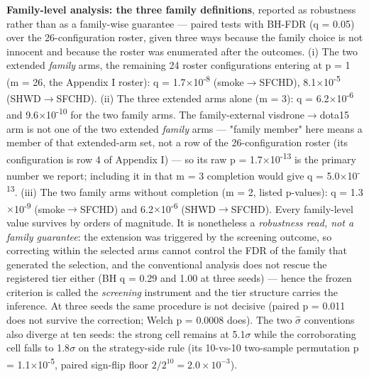 \documentclass[pdflatex,sn-mathphys-ay]{sn-jnl}
\begin{document}
\textbf{Family-level analysis: the three family definitions}, reported as robustness rather than as a family-wise guarantee --- paired tests with BH-FDR (q = 0.05) over the 26-configuration roster, given three ways because the family choice is not innocent and because the roster was enumerated after the outcomes. (i) The two extended \emph{family} arms, the remaining 24 roster configurations entering at p = 1 (m = 26, the Appendix I roster): q = 1.7\ensuremath{\times}10\textsuperscript{-8} (smoke\ensuremath{\rightarrow}SFCHD), 8.1\ensuremath{\times}10\textsuperscript{-5} (SHWD\ensuremath{\rightarrow}SFCHD). (ii) The three extended arms alone (m = 3): q = 6.2\ensuremath{\times}10\textsuperscript{-6} and 9.6\ensuremath{\times}10\textsuperscript{-10} for the two family arms. The family-external visdrone\ensuremath{\rightarrow}dota15 arm is not one of the two extended \emph{family} arms --- "family member" here means a member of that extended-arm set, not a row of the 26-configuration roster (its configuration is row 4 of Appendix I) --- so its raw p = 1.7\ensuremath{\times}10\textsuperscript{-13} is the primary number we report; including it in that m = 3 completion would give q = 5.0\ensuremath{\times}10\textsuperscript{-13}. (iii) The two family arms without completion (m = 2, listed p-values): q = 1.3\ensuremath{\times}10\textsuperscript{-9} (smoke\ensuremath{\rightarrow}SFCHD) and 6.2\ensuremath{\times}10\textsuperscript{-6} (SHWD\ensuremath{\rightarrow}SFCHD). Every family-level value survives by orders of magnitude. It is nonetheless a \emph{robustness read, not a family guarantee}: the extension was triggered by the screening outcome, so correcting within the selected arms cannot control the FDR of the family that generated the selection, and the conventional analysis does not rescue the registered tier either (BH q = 0.29 and 1.00 at three seeds) --- hence the frozen criterion is called the \emph{screening} instrument and the tier structure carries the inference. At three seeds the same procedure is not decisive (paired p = 0.011 does not survive the correction; Welch p = 0.0008 does). The two $\hat{\sigma}$ conventions also diverge at ten seeds: the strong cell remains at 5.1\ensuremath{\sigma} while the corroborating cell falls to 1.8\ensuremath{\sigma} on the strategy-side rule (its 10-vs-10 two-sample permutation p = 1.1\ensuremath{\times}10\textsuperscript{-5}, paired sign-flip floor $2/2^{10}=2.0\times10^{-3}$).
\end{document}
